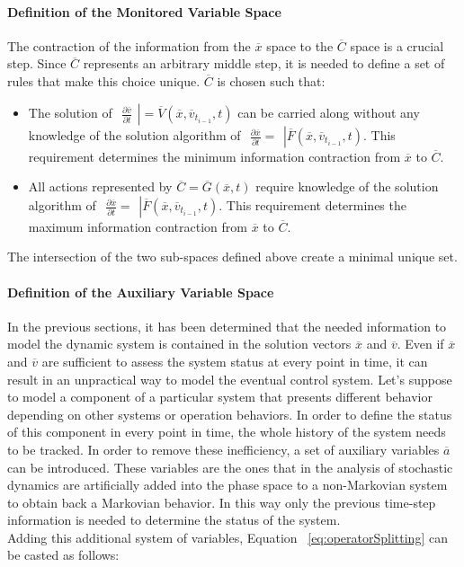 \paragraph{Definition of the Monitored Variable Space}
The contraction of the information from the $\overline{x}$ space to the $\overline{C}$ space is a crucial step. 
Since $\overline{C}$ represents an arbitrary middle step, it is needed to define a set of rules that make this 
choice unique. $\overline{C}$ is chosen such that:
\begin{itemize}
  \item The solution of  $ \left.\begin{matrix} \frac{\partial \overline{v} }{\partial t} 
  \end{matrix}\right| =\overline{V}\left (  \overline{x},\overline{v}_{t_{i-1}}, t \right )$
  can be carried along without any knowledge of the solution algorithm of
   $ \left.\begin{matrix} 
  \frac{\partial \overline{x} }{\partial t} =  \end{matrix}\right| \overline{F}\left (  
  \overline{x},\overline{v}_{t_{i-1}}, t \right )  
  $. This requirement determines the minimum information contraction from  $\overline{x}$ to  
  $\overline{C}$.
  \item All actions represented by $\overline{C} = \overline{G}(\overline{x},t)$ require knowledge of the 
  solution algorithm of 
  $ \left.\begin{matrix} 
  \frac{\partial \overline{x} }{\partial t} =  \end{matrix}\right| \overline{F}\left (  
  \overline{x},\overline{v}_{t_{i-1}}, t \right )  $. This requirement determines  the maximum  information contraction from  $\overline{x}$ to  $\overline{C}$.
\end{itemize}
The intersection of the two sub-spaces defined above create a minimal unique set.
\paragraph{Definition of the Auxiliary Variable Space}
In the previous sections, it has been determined that the needed information to model the dynamic system
is contained in the solution vectors $\overline{x}$ and $\overline{v}$. Even if $\overline{x}$ and $\overline{v}$ 
are sufficient to assess the system status at every point in time, it can result in an unpractical way to model
the eventual control system.
Let's suppose to model a component of a particular system that presents different behavior depending on 
other systems or operation behaviors. In order to define the status of this component in every point in time, the 
whole history of the system needs to be tracked. In order to remove these inefficiency, a set of auxiliary variables 
$\overline{a}$ can be introduced. These variables are the ones that in the analysis of stochastic dynamics 
are artificially added into the phase space to a non-Markovian system to obtain back a Markovian behavior. In this
way only the previous time-step information is needed to determine the status of the system. 
\\ Adding this additional system of variables, Equation ~\ref{eq:operatorSplitting} can be casted as follows:

